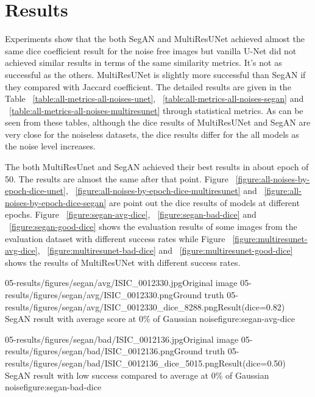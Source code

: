 \chapter{Results}

    Experiments show that the both SegAN and MultiResUNet achieved almost the same dice coefficient result for the noise free images
    but vanilla U-Net did not achieved similar results in terms of the same similarity metrics. It's not as successful as the others.
    MultiResUNet is slightly more successful than SegAN if they compared with Jaccard coefficient.
    The detailed results are given in the Table ~\ref{table:all-metrics-all-noises-unet}, ~\ref{table:all-metrics-all-noises-segan} and ~\ref{table:all-metrics-all-noises-multiresunet} through statistical metrics.
    As can be seen from these tables, although the dice results of MultiResUNet and SegAN are very close for the noiseless datasets, the dice results differ for the all models as the noise level increases.

    The both MultiResUnet and SegAN achieved their best results in about epoch of 50. The results are almost the same after that point.
    Figure ~\ref{figure:all-noises-by-epoch-dice-unet}, ~\ref{figure:all-noises-by-epoch-dice-multiresunet} and ~\ref{figure:all-noises-by-epoch-dice-segan} are point out the dice results of models at different epochs.
    Figure ~\ref{figure:segan-avg-dice}, ~\ref{figure:segan-bad-dice} and ~\ref{figure:segan-good-dice} shows the evaluation results of some images from the evaluation dataset with different success rates
    while Figure ~\ref{figure:multiresunet-avg-dice}, ~\ref{figure:multiresunet-bad-dice} and ~\ref{figure:multiresunet-good-dice} shows the results of MultiResUNet with different success rates.

    \sidebyside
        {05-results/figures/segan/avg/ISIC_0012330.jpg}{Original image}
        {05-results/figures/segan/avg/ISIC_0012330.png}{Ground truth}
        {05-results/figures/segan/avg/ISIC_0012330_dice_8288.png}{Result(dice=0.82)}
        {SegAN result with average score at 0\% of Gaussian noise}{figure:segan-avg-dice}

    \sidebyside
        {05-results/figures/segan/bad/ISIC_0012136.jpg}{Original image}
        {05-results/figures/segan/bad/ISIC_0012136.png}{Ground truth}
        {05-results/figures/segan/bad/ISIC_0012136_dice_5015.png}{Result(dice=0.50)}
        {SegAN result with low success compared to average at 0\% of Gaussian noise}{figure:segan-bad-dice}


